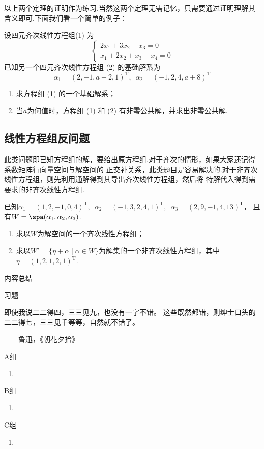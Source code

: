 以上两个定理的证明作为练习.当然这两个定理无需记忆，只需要通过证明理解其含义即可.下面我们看一个简单的例子：
\begin{example}
    设四元齐次线性方程组(1) 为\[\begin{cases}
        2x_1+3x_2-x_3=0 \\ x_1+2x_2+x_3-x_4=0
    \end{cases}\]已知另一个四元齐次线性方程组 (2) 的基础解系为
    \[\alpha_1=(2,-1,a+2,1)^\mathrm{T},\enspace\alpha_2=(-1,2,4,a+8)^\mathrm{T}\]
    \begin{enumerate}
        \item 求方程组 (1) 的一个基础解系；

        \item 当$a$为何值时，方程组 (1) 和 (2) 有非零公共解，并求出非零公共解.
    \end{enumerate}
\end{example}

\subsection{线性方程组反问题}

此类问题即已知方程组的解，要给出原方程组.对于齐次的情形，如果大家还记得系数矩阵行向量空间与解空间的
正交补关系，此类题目是容易解决的.对于非齐次线性方程组，则先利用通解得到其导出齐次线性方程组，然后将
特解代入得到需要求的非齐次线性方程组.
\begin{example}
    已知$\alpha_1=(1,2,-1,0,4)^\mathrm{T},\enspace\alpha_2=(-1,3,2,4,1)^\mathrm{T},\enspace\alpha_3=(2,9,-1,4,13)^\mathrm{T}$，
    且有$W=\spa(\alpha_1,\alpha_2,\alpha_3)$.
    \begin{enumerate}
        \item 求以$W$为解空间的一个齐次线性方程组；

        \item 求以$W'=\{\eta+\alpha \mid \alpha\in W\}$为解集的一个非齐次线性方程组，其中$\eta=(1,2,1,2,1)^\mathrm{T}$.
    \end{enumerate}
\end{example}

\vspace{2ex}
\centerline{\heiti \Large 内容总结}

\vspace{2ex}

\centerline{\heiti \Large 习题}
\vspace{2ex}
{\kaishu 即使我说二二得四，三三见九，也没有一字不错。
这些既然都错，则绅士口头的二二得七，三三见千等等，自然就不错了。}
\begin{flushright}
    \kaishu
    ——鲁迅，《朝花夕拾》
\end{flushright}
\centerline{\heiti A组}
\begin{enumerate}
    \item
\end{enumerate}
\centerline{\heiti B组}
\begin{enumerate}
    \item
\end{enumerate}
\centerline{\heiti C组}
\begin{enumerate}
    \item
\end{enumerate}

